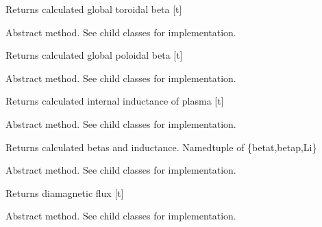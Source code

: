 \documentclass[letterpaper,10pt,english]{sphinxmanual}
\begin{document}
\begin{fulllineitems}
\begin{fulllineitems}
Returns calculated global toroidal beta {[}t{]}

\end{fulllineitems}


\begin{fulllineitems}
\label{eqtools:eqtools.core.Equilibrium.getBetaP}
Abstract method.  See child classes for implementation.

Returns calculated global poloidal beta {[}t{]}

\end{fulllineitems}


\begin{fulllineitems}
\label{eqtools:eqtools.core.Equilibrium.getLi}
Abstract method.  See child classes for implementation.

Returns calculated internal inductance of plasma {[}t{]}

\end{fulllineitems}


\begin{fulllineitems}
\label{eqtools:eqtools.core.Equilibrium.getBetas}
Abstract method.  See child classes for implementation.

Returns calculated betas and inductance.
Namedtuple of \{betat,betap,Li\}

\end{fulllineitems}


\begin{fulllineitems}
\label{eqtools:eqtools.core.Equilibrium.getDiamagFlux}
Abstract method.  See child classes for implementation.

Returns diamagnetic flux {[}t{]}

\end{fulllineitems}


\begin{fulllineitems}
\label{eqtools:eqtools.core.Equilibrium.getDiamagBetaT}
Abstract method.  See child classes for implementation.


\end{fulllineitems}
\end{fulllineitems}
\end{document}

